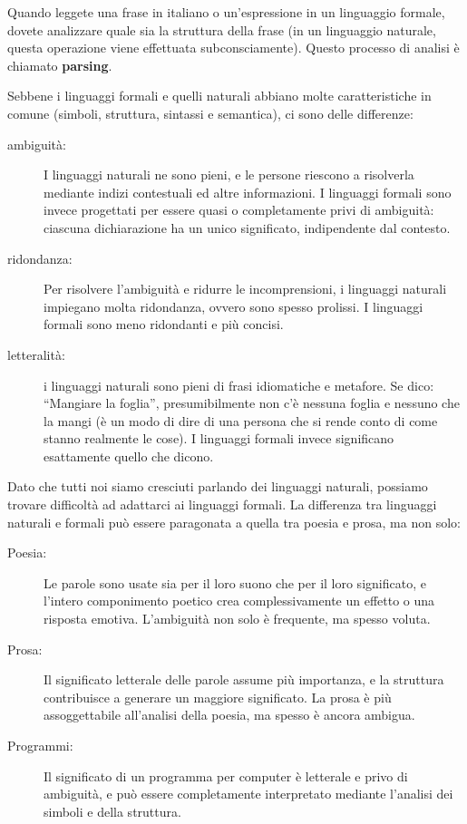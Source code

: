 \documentclass[10pt]{book}
\begin{document}
Quando leggete una frase in italiano o un'espressione in un linguaggio formale, dovete analizzare quale sia la struttura della frase (in un linguaggio naturale, questa operazione viene effettuata subconsciamente). Questo processo di analisi è chiamato {\bf parsing}.

Sebbene i linguaggi formali e quelli naturali abbiano molte caratteristiche in comune (simboli, struttura, sintassi e semantica), ci sono delle differenze:

\begin{description}

\item[ambiguità:] I linguaggi naturali ne sono pieni, e le persone riescono a risolverla mediante indizi contestuali ed altre informazioni. I linguaggi formali sono invece progettati per essere quasi o completamente privi di ambiguità: ciascuna dichiarazione ha un unico significato, indipendente dal contesto.

\item[ridondanza:] Per risolvere l'ambiguità e ridurre le incomprensioni, i linguaggi naturali impiegano molta ridondanza, ovvero sono spesso prolissi. I linguaggi formali sono meno ridondanti e più concisi.

\item[letteralità:] i linguaggi naturali sono pieni di frasi idiomatiche e metafore. Se dico: ``Mangiare la foglia'', presumibilmente non c'è nessuna foglia e nessuno che la mangi (è un modo di dire di una persona che si rende conto di come stanno realmente le cose). I linguaggi formali invece significano esattamente quello che dicono.

\end{description}

Dato che tutti noi siamo cresciuti parlando dei linguaggi naturali, possiamo trovare difficoltà ad adattarci ai linguaggi formali. La differenza tra linguaggi naturali e formali può essere paragonata a quella tra poesia e prosa, ma non solo:

\begin{description}

\item[Poesia:] Le parole sono usate sia per il loro suono che per il loro significato, e l'intero componimento poetico crea complessivamente un effetto o una risposta emotiva. L'ambiguità non solo è frequente, ma spesso voluta.

\item[Prosa:] Il significato letterale delle parole assume più importanza, e la struttura contribuisce a generare un maggiore significato. La prosa è più assoggettabile all'analisi della poesia, ma spesso è ancora ambigua.

\item[Programmi:] Il significato di un programma per computer è letterale e privo di ambiguità, e può essere completamente interpretato mediante l'analisi dei simboli e della struttura.

\end{description}
\end{document}
